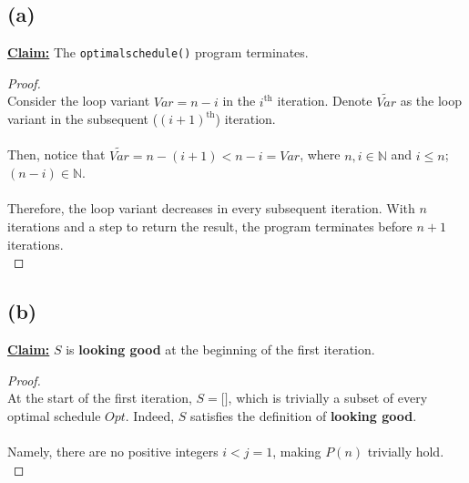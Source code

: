 \documentclass[12pt]{article}
\begin{document}
\subsection*{(a)}
\underline{\textbf{Claim:}} The \texttt{optimalschedule()} program terminates.
\begin{proof}
\leavevmode\\
    Consider the loop variant \( Var = n - i \) in the \( i^{\text{th}} \) iteration. Denote \( \widetilde{Var} \) as the loop variant in the subsequent (\( (i + 1)^{\text{th}} \)) iteration. \\
    \\
    Then, notice that \( \widetilde{Var} = n - (i + 1) < n - i = Var \), where \( n, i \in \mathbb{N} \) and \( i \leq n \); \( (n - i) \in \mathbb{N} \). \\
    \\
    Therefore, the loop variant decreases in every subsequent iteration. With \( n \) iterations and a step to return the result, the program terminates before \( n + 1 \) iterations. \\ 
\end{proof}
\subsection*{(b)}
\underline{\textbf{Claim:}} \( S \) is \textbf{looking good} at the beginning of the first iteration.
\begin{proof}
\leavevmode\\
    At the start of the first iteration, \( S = \texttt{[]} \), which is trivially a subset of every optimal schedule \( Opt \). Indeed, \( S \) satisfies the definition of \textbf{looking good}. \\
    \\
    Namely, there are no positive integers \( i < j = 1 \), making \( P(n) \) trivially hold. \\
\end{proof}
\end{document}
